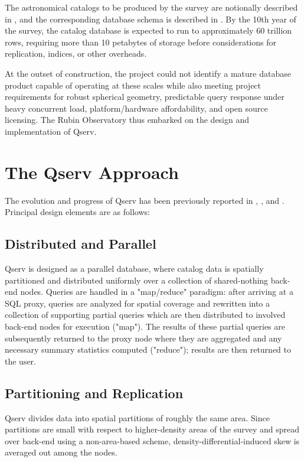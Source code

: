 \documentclass[11pt,twoside]{article}
\begin{document}
The astronomical catalogs to be produced by the survey are notionally described in \citet{LSE-163}, and the
corresponding database schema is described in \citet{LDM-153}.  By the 10th year of the survey, the catalog
database is expected to run to approximately 60 trillion rows, requiring more than 10 petabytes of storage
before considerations for replication, indices, or other overheads.

At the outset of construction, the project could not identify a mature database product capable of operating
at these scales while also meeting project requirements for robust spherical geometry, predictable query
response under heavy concurrent load, platform/hardware affordability, and open source licensing.  The Rubin
Observatory thus embarked on the design and implementation of Qserv.

\section{The Qserv Approach}

The evolution and progress of Qserv has been previously reported in \citet{2006SPIE.6270E..0RB},
\citet{2011Wang:2011:QDS:2063348.2063364}, and \citet{LDM-135}.  Principal design elements are as follows:

\subsection{Distributed and Parallel}

Qserv is designed as a parallel database, where catalog data is spatially partitioned and distributed
uniformly over a collection of shared-nothing back-end nodes.  Queries are handled in a "map/reduce" paradigm:
after arriving at a SQL proxy, queries are analyzed for spatial coverage and rewritten into a collection of
supporting partial queries which are then distributed to involved back-end nodes for execution ("map"). The
results of these partial queries are subsequently returned to the proxy node where they are aggregated and any
necessary summary statistics computed ("reduce"); results are then returned to the user.

\subsection{Partitioning and Replication}

Qserv divides data into spatial partitions of roughly the same area.  Since partitions are small with respect
to higher-density areas of the survey and spread over back-end using a non-area-based scheme,
density-differential-induced skew is averaged out among the nodes.
\end{document}

